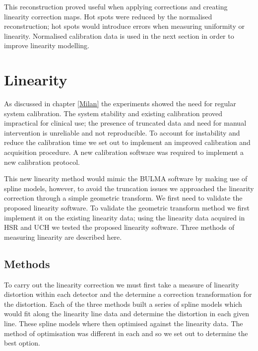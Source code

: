 This reconstruction proved useful when applying corrections and creating linearity correction maps. Hot spots were reduced by the normalised reconstruction; hot spots would introduce errors when measuring uniformity or linearity. Normalised calibration data is used in the next section in order to improve linearity modelling.

\section{Linearity}
As discussed in chapter \ref{Milan} the experiments showed the need for regular system calibration. The system stability and existing calibration proved impractical for clinical use; the presence of truncated data and need for manual intervention is unreliable and not reproducible. To account for instability and reduce the calibration time we set out to implement an improved calibration and acquisition procedure. A new calibration software was required to implement a new calibration protocol.

This new linearity method would mimic the BULMA software by making use of spline models, however, to avoid the truncation issues we approached the linearity correction through a simple geometric transform. We first need to validate the proposed linearity software. To validate the geometric transform method we first implement it on the existing linearity data; using the linearity data acquired in \acrshort{HSR} and \acrshort{UCH} we tested the proposed linearity software. Three methods of measuring linearity are described here. 

\subsection{Methods}
To carry out the linearity correction we must first take a measure of linearity distortion within each detector and the determine a correction transformation for the distortion. Each of the three methods built a series of spline models which would fit along the linearity line data and determine the distortion in each given line. These spline models where then optimised against the linearity data. The method of optimisation was different in each and so we set out to determine the best option. 

